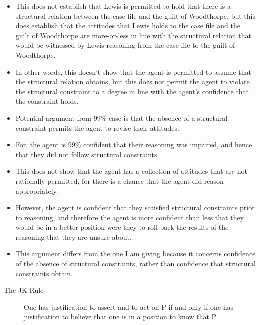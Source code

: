 \documentclass[10pt]{article}
\newcommand{\hozlinedash}[0]{%
  \noindent\hdashrule[0.5ex][c]{\textwidth}{.1pt}{2.5pt}
}
\begin{document}
\begin{itemize}
\item This does not establish that Lewis is permitted to hold that there is a structural relation between the case file and the guilt of Woodthorpe, but this does establish that the attitudes that Lewis holds to the case file and the guilt of Woodthorpe are more-or-less in line with the structural relation that would be witnessed by Lewis reasoning from the case file to the guilt of Woodthorpe.
\item In other words, this doesn't show that the agent is permitted to assume that the structural relation obtains, but this does not permit the agent to violate the structural constraint to a degree in line with the agent's confidence that the constraint holds.
\end{itemize}

\begin{itemize}
\item Potential argument from 99\% case is that the absence of a structural constraint permits the agent to revise their attitudes.
\item For, the agent is 99\% confident that their reasoning was impaired, and hence that they did not follow structural constraints.
\item This does not show that the agent has a collection of attitudes that are not rationally permitted, for there is a chance that the agent did reason appropriately.
\item However, the agent is confident that they satisfied structural constraints prior to reasoning, and therefore the agent is more confident than less that they would be in a better position were they to roll back the results of the reasoning that they are unsure about.
\item This argument differs from the one I am giving because it concerns confidence of the absence of structural constraints, rather than confidence that structural constraints obtain.
\end{itemize}

\begin{description}
\item[The JK Rule] One has justification to assert and to act on P if and only if one has justification to believe that one is in a position to know that P
\end{description}

\hozlinedash
\end{document}
